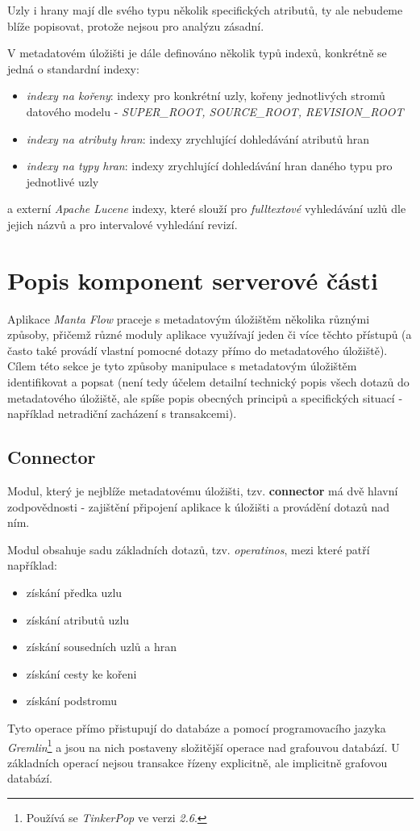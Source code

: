 Uzly i hrany mají dle svého typu několik specifických atributů, ty ale nebudeme blíže popisovat, protože nejsou pro analýzu zásadní.

V metadatovém úložišti je dále definováno několik typů indexů, konkrétně se jedná o standardní indexy:

\begin{itemize}
	\item{\textit{indexy na kořeny}}: indexy pro konkrétní uzly, kořeny jednotlivých stromů datového modelu - \textit{SUPER\_ROOT, SOURCE\_ROOT, REVISION\_ROOT}
	\item{\textit{indexy na atributy hran}}: indexy zrychlující dohledávání atributů hran
	\item{\textit{indexy na typy hran}}: indexy zrychlující dohledávání hran daného typu pro jednotlivé uzly
\end{itemize}

a externí \textit{Apache Lucene} indexy, které slouží pro \textit{fulltextové} vyhledávání uzlů dle jejich názvů a pro intervalové vyhledání revizí.


\section{Popis komponent serverové části}
\label{sec:ana_components}

Aplikace \textit{Manta Flow} praceje s metadatovým úložištěm několika různými způsoby, přičemž různé moduly aplikace využívají jeden či více těchto přístupů (a často také provádí vlastní pomocné dotazy přímo do metadatového úložiště). Cílem této sekce je tyto způsoby manipulace s metadatovým úložištěm identifikovat a popsat (není tedy účelem detailní technický popis všech dotazů do metadatového úložiště, ale spíše popis obecných principů a specifických situací - například netradiční zacházení s transakcemi).

\subsection{Connector}
\label{sec:ana_connector}
Modul, který je nejblíže metadatovému úložišti, tzv. \textbf{connector} má dvě hlavní zodpovědnosti - zajištění připojení aplikace k úložišti a provádění dotazů nad ním.

Modul obsahuje sadu základních dotazů, tzv. \textit{operatinos}, mezi které patří například:
\begin{itemize}
	\item{získání předka uzlu}
	\item{získání atributů uzlu}
	\item{získání sousedních uzlů a hran}
	\item{získání cesty ke kořeni}
	\item{získání podstromu}
\end{itemize}
Tyto operace přímo přistupují do databáze a pomocí programovacího jazyka \textit{Gremlin}\footnote{Používá se \textit{TinkerPop} ve verzi \textit{2.6}.} a jsou na nich postaveny složitější operace nad grafouvou databází. U základních operací nejsou transakce řízeny explicitně, ale implicitně grafovou databází.

